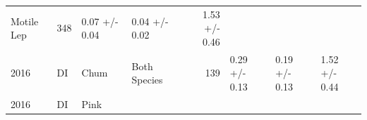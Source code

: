 \documentclass[fleqn,10pt]{wlpeerj} %
\begin{document}
\begin{longtable}[]{@{}llllrlll@{}}
\begin{minipage}[t]{0.11\columnwidth}
Motile Lep\strut
\end{minipage} & \begin{minipage}[t]{0.04\columnwidth}\raggedleft\strut
348\strut
\end{minipage} & \begin{minipage}[t]{0.14\columnwidth}\raggedright\strut
0.07 +/- 0.04\strut
\end{minipage} & \begin{minipage}[t]{0.14\columnwidth}\raggedright\strut
0.04 +/- 0.02\strut
\end{minipage} & \begin{minipage}[t]{0.14\columnwidth}\raggedright\strut
1.53 +/- 0.46\strut
\end{minipage}\tabularnewline
\begin{minipage}[t]{0.09\columnwidth}\raggedright\strut
2016\strut
\end{minipage} & \begin{minipage}[t]{0.06\columnwidth}\raggedright\strut
DI\strut
\end{minipage} & \begin{minipage}[t]{0.06\columnwidth}\raggedright\strut
Chum\strut
\end{minipage} & \begin{minipage}[t]{0.11\columnwidth}\raggedright\strut
Both Species\strut
\end{minipage} & \begin{minipage}[t]{0.04\columnwidth}\raggedleft\strut
139\strut
\end{minipage} & \begin{minipage}[t]{0.14\columnwidth}\raggedright\strut
0.29 +/- 0.13\strut
\end{minipage} & \begin{minipage}[t]{0.14\columnwidth}\raggedright\strut
0.19 +/- 0.13\strut
\end{minipage} & \begin{minipage}[t]{0.14\columnwidth}\raggedright\strut
1.52 +/- 0.44\strut
\end{minipage}\tabularnewline
\begin{minipage}[t]{0.09\columnwidth}\raggedright\strut
2016\strut
\end{minipage} & \begin{minipage}[t]{0.06\columnwidth}\raggedright\strut
DI\strut
\end{minipage} & \begin{minipage}[t]{0.06\columnwidth}\raggedright\strut
Pink\strut
\end{minipage} & \begin{minipage}[t]{0.11\columnwidth}\raggedright\strut

\end{minipage}
\end{longtable}
\end{document}
